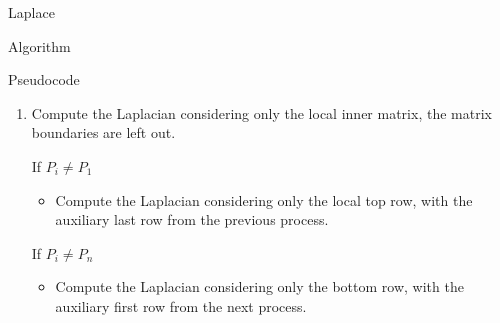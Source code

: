 \begin{chapter}{Laplace}
\begin{section}{Algorithm}
\begin{subsection}{Pseudocode}
\begin{enumerate}
\begin{enumerate}
                    \item Compute the Laplacian considering only the local inner matrix, the matrix boundaries are left out.
                    \begin{item}
                        If $P_i \neq P_1$
                        \begin{itemize}
                            \item Compute the Laplacian considering only the local top row, with the auxiliary last row from the previous process.
                        \end{itemize}
                    \end{item}
                    \begin{item}
                        If $P_i \neq P_n$
                        \begin{itemize}
                            \item Compute the Laplacian considering only the bottom row, with the auxiliary first row from the next process.
                        \end{itemize}
                    \end{item}
                \end{enumerate}
            \end{enumerate}
        \end{subsection}
    \end{section}
\end{chapter}